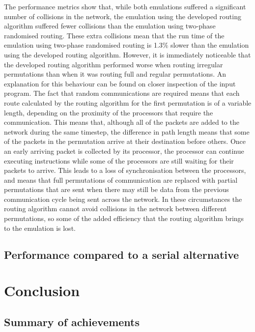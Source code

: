 \documentclass[a4paper, 12pt]{article}
\begin{document}
The performance metrics show that, while both emulations suffered a significant number of collisions in the network, the emulation using the developed routing algorithm suffered fewer collisions than the emulation using two-phase randomised routing. These extra collisions mean that the run time of the emulation using two-phase randomised routing is 1.3\% slower than the emulation using the developed routing algorithm. However, it is immediately noticeable that the developed routing algorithm performed worse when routing irregular permutations than when it was routing full and regular permutations. An explanation for this behaviour can be found on closer inspection of the input program. The fact that random communications are required means that each route calculated by the routing algorithm for the first permutation is of a variable length, depending on the proximity of the processors that require the communication. This means that, although all of the packets are added to the network during the same timestep, the difference in path length means that some of the packets in the permutation arrive at their destination before others. Once an early arriving packet is collected by its processor, the processor can continue executing instructions while some of the processors are still waiting for their packets to arrive. This leads to a loss of synchronisation between the processors, and means that full permutations of communication are replaced with partial permutations that are sent when there may still be data from the previous communication cycle being sent across the network. In these circumstances the routing algorithm cannot avoid collisions in the network between different permutations, so some of the added efficiency that the routing algorithm brings to the emulation is lost.

\subsection{Performance compared to a serial alternative}



\newpage
\section{Conclusion}

\subsection{Summary of achievements}
\end{document}
